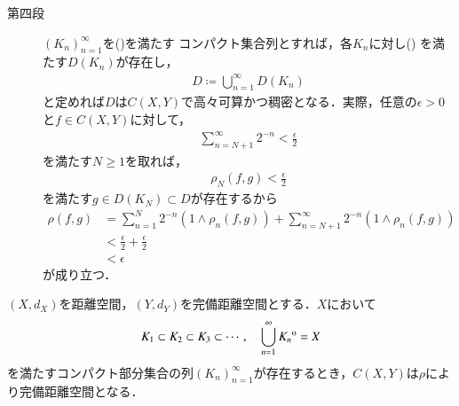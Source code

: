 \begin{prf}
\begin{description}
			\item[第四段]				
				$(K_n)_{n=1}^\infty$を()を満たす
				コンパクト集合列とすれば，各$K_n$に対し()
				を満たす$D(K_n)$が存在し，
				\begin{align}
					D \coloneqq \bigcup_{n=1}^\infty D(K_n)
				\end{align}
				と定めれば$D$は$C(X,Y)$で高々可算かつ稠密となる．実際，任意の$\epsilon > 0$と$f \in C(X,Y)$に対して，
				\begin{align}
					\sum_{n=N+1}^\infty 2^{-n} < \frac{\epsilon}{2}
				\end{align}
				を満たす$N \geq 1$を取れば，
				\begin{align}
					\rho_N(f,g) < \frac{\epsilon}{2}
				\end{align}
				を満たす$g \in D(K_N) \subset D$が存在するから
				\begin{align}
					\rho(f,g) &= \sum_{n=1}^N 2^{-n} \left( 1 \wedge \rho_n(f,g) \right)
						+ \sum_{n=N+1}^\infty 2^{-n} \left( 1 \wedge \rho_n(f,g) \right) \\
					&< \frac{\epsilon}{2} + \frac{\epsilon}{2} \\
					&< \epsilon
				\end{align}
				が成り立つ．
				\QED
		\end{description}
	\end{prf}
	
	\begin{screen}
		\begin{thm}[$C(X,Y)$の完備性]
			$(X,d_X)$を距離空間，$(Y,d_Y)$を完備距離空間とする．$X$において
			\begin{align}
				K_1 \subset K_2 \subset K_3 \subset \cdots,
				\quad \bigcup_{n=1}^\infty {\kern0ptK_n}^{\mathrm{o}} = X
				\label{eq:completeness_and_separability_of_space_of_continuous_functions_2}
			\end{align}
			を満たすコンパクト部分集合の列$(K_n)_{n=1}^\infty$が存在するとき，$C(X,Y)$は$\rho$により完備距離空間となる．
		\end{thm}
	\end{screen}
	
